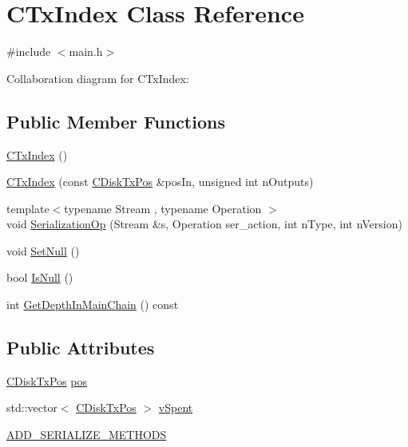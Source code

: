 \hypertarget{class_c_tx_index}{}\section{C\+Tx\+Index Class Reference}
\label{class_c_tx_index}


{\ttfamily \#include $<$main.\+h$>$}



Collaboration diagram for C\+Tx\+Index\+:
\subsection*{Public Member Functions}
\begin{DoxyCompactItemize}
\item 
\hyperlink{class_c_tx_index_a08f6b57bc2852af37dd5a13b9d5877cc}{C\+Tx\+Index} ()
\item 
\hyperlink{class_c_tx_index_ad01109597d73bef7ea576d1e1613415f}{C\+Tx\+Index} (const \hyperlink{class_c_disk_tx_pos}{C\+Disk\+Tx\+Pos} \&pos\+In, unsigned int n\+Outputs)
\item 
{\footnotesize template$<$typename Stream , typename Operation $>$ }\\void \hyperlink{class_c_tx_index_a8d7003336ce67c83268dac7dcae14199}{Serialization\+Op} (Stream \&s, Operation ser\+\_\+action, int n\+Type, int n\+Version)
\item 
void \hyperlink{class_c_tx_index_a379327d4654c726dea38486f1c1f800d}{Set\+Null} ()
\item 
bool \hyperlink{class_c_tx_index_a27f2d2e6bc1fad724bd5bff9eeb694fc}{Is\+Null} ()
\item 
int \hyperlink{class_c_tx_index_ab6119cf086e8e4b2c690f36c15479220}{Get\+Depth\+In\+Main\+Chain} () const 
\end{DoxyCompactItemize}
\subsection*{Public Attributes}
\begin{DoxyCompactItemize}
\item 
\hyperlink{class_c_disk_tx_pos}{C\+Disk\+Tx\+Pos} \hyperlink{class_c_tx_index_ac68a69ed4335b3f50b954c71ec0a9c32}{pos}
\item 
std\+::vector$<$ \hyperlink{class_c_disk_tx_pos}{C\+Disk\+Tx\+Pos} $>$ \hyperlink{class_c_tx_index_a88317d56c02acd1faec4863bcb293d2c}{v\+Spent}
\item 
\hyperlink{class_c_tx_index_a1bafe447bd4fcead6588a984167a7c36}{A\+D\+D\+\_\+\+S\+E\+R\+I\+A\+L\+I\+Z\+E\+\_\+\+M\+E\+T\+H\+O\+D\+S}
\end{DoxyCompactItemize}
